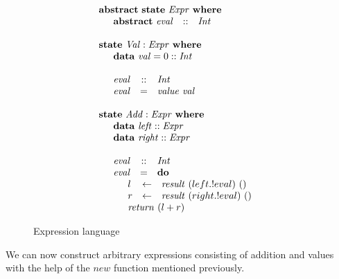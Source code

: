 \begin{figure}
\begin{displaymath}
\begin{array}{l}
\mathbf{abstract}~\mathbf{state}~\mathit{Expr}~\mathbf{where} \\
\quad \begin{array}{lcl}
\mathbf{abstract}~\mathit{eval} & :: & \mathit{Int}
\end{array} \\\\
\mathbf{state}~\mathit{Val} : \mathit{Expr}~\mathbf{where} \\
\quad \begin{array}{lcl}
\multicolumn{3}{l}{\mathbf{data}~\mathit{val} = 0  :: \mathit{Int}} \\\\
\mathit{eval} & :: & \mathit{Int} \\
\mathit{eval} & = & \mathit{value}~\mathit{val}
\end{array} \\\\
\mathbf{state}~\mathit{Add} : \mathit{Expr}~\mathbf{where} \\
\quad \begin{array}{lcl}
\multicolumn{3}{l}{\mathbf{data}~\mathit{left}  :: \mathit{Expr}} \\
\multicolumn{3}{l}{\mathbf{data}~\mathit{right}  :: \mathit{Expr}} \\\\
\mathit{eval} & :: & \mathit{Int} \\
\mathit{eval} & = & \mathbf{do} \\
\multicolumn{3}{l}{\quad \begin{array}{lcl}
    l & \leftarrow & \mathit{result}~(left.!eval)~() \\
    r & \leftarrow & \mathit{result}~(right.!eval)~() \\
    \multicolumn{3}{l}{\mathit{return}~(l + r)}
    \end{array}} 
\end{array} 
\end{array}
\end{displaymath}
\caption{Expression language}
\label{fig:razor}
\end{figure}

We can now construct arbitrary expressions consisting of addition and values with the help of the $\mathit{new}$ function mentioned previously.

